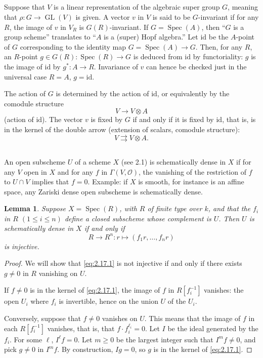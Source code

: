 \documentclass[11pt,a4paper]{article}
\theoremstyle{plain}
\newtheorem{lemma}[theorem]{Lemma}
\theoremstyle{definition}
\DeclareMathOperator{\Spec}{Spec}
\DeclareMathOperator{\GL}{GL}
\begin{document}
\subsection{}
\label{sec:2.15}
Suppose that $V$ is a linear representation of the algebraic super group $G$, meaning that $\rho: G \to \GL(V)$ is given. A vector $v$ in $V$ is said to be $G$-invariant if for any $R$, the image of $v$ in $V_R$ is $G(R)$-invariant. If $G = \Spec(A)$, then ``$G$ is a group scheme'' translates to ``$A$ is a (super) Hopf algebra.'' Let $\mathrm{id}$ be the $A$-point of $G$ corresponding to the identity map $G = \Spec(A) \to G$. Then, for any $R$, an $R$-point $g \in G(R) : \Spec(R) \to G$ is deduced from $\mathrm{id}$ by functoriality: $g$ is the image of $\mathrm{id}$ by $g^* : A \to R$. Invariance of $v$ can hence be checked just in the universal case $R = A$, $g = \mathrm{id}$.

The action of $G$ is determined by the action of $\mathrm{id}$, or equivalently by the comodule structure
\[
V \to V \otimes A
\]
(action of $\mathrm{id}$). The vector $v$ is fixed by $G$ if and only if it is fixed by $\mathrm{id}$, that is, is in the kernel of the double arrow (extension of scalars, comodule structure):
\[
V \rightrightarrows V \otimes A.
\]

\subsection{}
An open subscheme $U$ of a scheme $X$ (see 2.1) is schematically dense in $X$ if for any $V$ open in $X$ and for any $f$ in $\Gamma(V, \mathcal{O})$, the vanishing of the restriction of $f$ to $U \cap V$ implies that $f = 0$. Example: if $X$ is smooth, for instance is an affine space, any Zariski dense open subscheme is schematically dense.

\begin{lemma}\label{lem:2.17}
Suppose $X = \Spec(R)$, with $R$ of finite type over $k$, and that the $f_i$ in $R$ $(1 \leq i \leq n)$ define a closed subscheme whose complement is $U$. Then $U$ is schematically dense in $X$ if and only if
\begin{equation}\label{eq:2.17.1}
R \to R^n : r \mapsto (f_1 r, \dots, f_n r)
\end{equation}
is injective.
\end{lemma}

\begin{proof}
We will show that \eqref{eq:2.17.1} is not injective if and only if there exists $g \neq 0$ in $R$ vanishing on $U$.

If $f \neq 0$ is in the kernel of \eqref{eq:2.17.1}, the image of $f$ in $R[f_i^{-1}]$ vanishes: the open $U_i$ where $f_i$ is invertible, hence on the union $U$ of the $U_i$.

Conversely, suppose that $f \neq 0$ vanishes on $U$. This means that the image of $f$ in each $R[f_i^{-1}]$ vanishes, that is, that $f \cdot f_i^{\ell_i} = 0$. Let $I$ be the ideal generated by the $f_i$. For some $\ell$, $I^\ell f = 0$. Let $m \geq 0$ be the largest integer such that $I^m f \neq 0$, and pick $g \neq 0$ in $I^m f$. By construction, $Ig = 0$, so $g$ is in the kernel of \eqref{eq:2.17.1}.
\end{proof}
\end{document}
